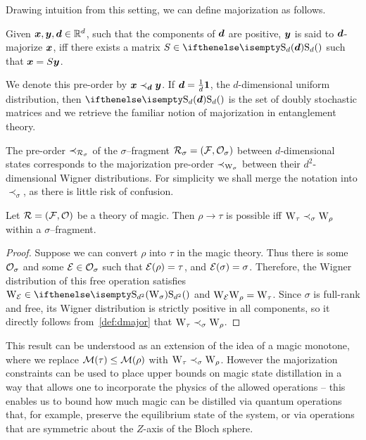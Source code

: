 \documentclass[pra,
aps,
twocolumn,
superscriptaddress,
groupedaddress,
nofootinbib,
reprint
]{revtex4-1}
\begin{document}
Drawing intuition from this setting, we can define majorization as follows.
\begin{definition}\label{def:dmajor}
    Given $\bm{x}, \bm{y}, \bm{d} \in \mathbb{R}^d$, such that the components of $\bm{d}$ are positive, $\bm{y}$ is said to $\bm{d}$-majorize $\bm{x}$, iff there exists a matrix $S \in \stoch$ such that $\bm{x} = S\bm{y}$.
\end{definition}
We denote this pre-order by $\bm{x} \prec_{\bm{d}} \bm{y}$.
If $\bm{d} = \frac{1}{d}\bm{1}$, the $d$-dimensional uniform distribution, then $\stoch$ is the set of doubly stochastic matrices and we retrieve the familiar notion of majorization in entanglement theory. 

The pre-order $\prec_{\mathcal{R}_\sigma}$ of the $\sigma$--fragment $\mathcal{R}_\sigma = (\mathcal{F}, \mathcal{O}_\sigma)$ between $d$-dimensional states corresponds to the majorization pre-order $\prec_{\W{\sigma}}$ between their $d^2$-dimensional Wigner distributions.
For simplicity we shall merge the notation into $\prec_\sigma$, as there is little risk of confusion.


\begin{theorem}\label{thm:sigmamajor}
    Let $\mathcal{R} = (\mathcal{F}, \mathcal{O})$ be a theory of magic. Then $\rho \longrightarrow \tau$ is possible iff  $\W{\tau} \prec_\sigma \W{\rho}$ within a $\sigma$--fragment.
\end{theorem}
\begin{proof}
Suppose we can convert $\rho$ into $\tau$ in the magic theory. 
Thus there is some $\mathcal{O}_\sigma$ and some $\mathcal{E} \in \mathcal{O}_\sigma$ such that $\mathcal{E}(\rho) = \tau$, and $\mathcal{E}(\sigma)=\sigma$. 
Therefore, the Wigner distribution of this free operation satisfies $\W{\E} \in \stochw$ and $\W{\E}\W{\rho} = \W{\tau}$. 
Since $\sigma$ is full-rank and free, its Wigner distribution is strictly positive in all components, so it directly follows from~\cref{def:dmajor} that $\W{\tau} \prec_{\sigma} \W{\rho}$.
\end{proof}
This result can be understood as an extension of the idea of a magic monotone, where we replace $\mathcal{M}(\tau) \leq \mathcal{M}(\rho)$ with $\W{\tau} \prec_\sigma \W{\rho}$. 
However the majorization constraints can be used to place upper bounds on magic state distillation in a way that allows one to incorporate the physics of the allowed operations -- this enables us to bound how much magic can be distilled via quantum operations that, for example, preserve the equilibrium state of the system, or via operations that are symmetric about the $Z$-axis of the Bloch sphere.
\end{document}
